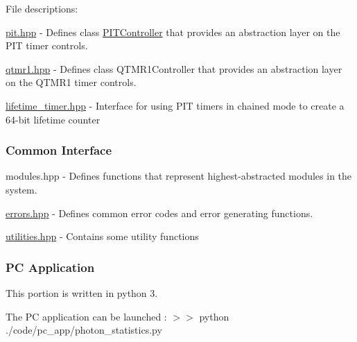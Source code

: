 File descriptions\+:


\begin{DoxyItemize}
\item {\ttfamily \hyperlink{pit_8hpp}{pit.\+hpp}} -\/ Defines {\ttfamily class \hyperlink{classPITController}{P\+I\+T\+Controller}} that provides an abstraction layer on the P\+IT timer controls.
\item {\ttfamily \hyperlink{qtmr1_8hpp}{qtmr1.\+hpp}} -\/ Defines \textquotesingle{}class Q\+T\+M\+R1\+Controller\textquotesingle{} that provides an abstraction layer on the Q\+T\+M\+R1 timer controls.
\item {\ttfamily \hyperlink{lifetime__timer_8hpp}{lifetime\+\_\+timer.\+hpp}} -\/ Interface for using P\+IT timers in chained mode to create a 64-\/bit lifetime counter
\end{DoxyItemize}

\subsubsection*{Common Interface}


\begin{DoxyItemize}
\item {\ttfamily modules.\+hpp} -\/ Defines functions that represent highest-\/abstracted modules in the system.
\item {\ttfamily \hyperlink{errors_8hpp}{errors.\+hpp}} -\/ Defines common error codes and error generating functions.
\item {\ttfamily \hyperlink{utilities_8hpp}{utilities.\+hpp}} -\/ Contains some utility functions
\end{DoxyItemize}

\subsubsection*{PC Application}

This portion is written in python 3.

The PC application can be launched \+: {\ttfamily $>$$>$ python ./code/pc\+\_\+app/photon\+\_\+statistics.py} 